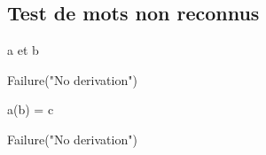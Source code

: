 \documentclass[a4paper,12pt]{article}
\begin{document}









\medskip
\subsection{Test de mots non reconnus}

\noindent a et b

\noindent Failure("No derivation")

\medskip

\noindent a(b) = c

\noindent Failure("No derivation")
\end{document}
